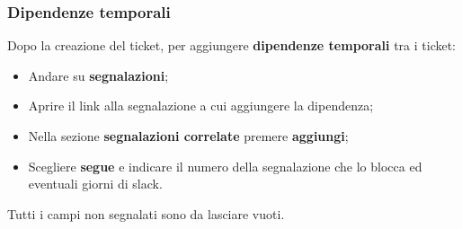 \documentclass[a4paper,12pt]{article}
\begin{document}
\subsubsection{Dipendenze temporali}
{

Dopo la creazione del ticket, per aggiungere \textbf{dipendenze temporali} tra i ticket:
\begin{itemize}
\item Andare su \textbf{segnalazioni}; 
\item Aprire il link alla segnalazione a cui aggiungere la dipendenza; 
\item Nella sezione \textbf{segnalazioni correlate} premere \textbf{aggiungi}; 
\item Scegliere \textbf{segue} e indicare il numero della segnalazione che lo blocca ed eventuali giorni di slack. 

\end{itemize} 
}
Tutti i campi non segnalati sono da lasciare vuoti. 
\end{document}
